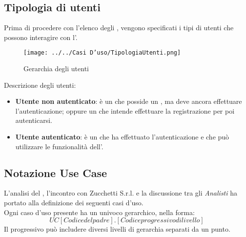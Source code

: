 \subsection{Tipologia di utenti}
Prima di procedere con l’elenco degli , vengono specificati i tipi di utenti che possono interagire con l'.
\begin{figure}[h!]
\centering
\texttt{[image: ../../Casi D'uso/TipologiaUtenti.png]}
\caption{Gerarchia degli utenti}
 \end{figure}

 Descrizione degli utenti:

 \begin{itemize}
 \item \textbf{Utente non autenticato}: è un  che posside un , ma deve ancora effettuare l'autenticazione; oppure un  che intende effettuare la registrazione per poi autenticarsi.
 \item \textbf{Utente autenticato}: è un  che ha effettuato l'autenticazione e che può utilizzare le funzionalità dell'.
 \end{itemize}

\subsection{Notazione Use Case}
L'analisi del , l'incontro con Zucchetti S.r.l. e la discussione tra gli \emph{Analisti} ha portato alla definizione dei seguenti casi d'uso.\\
Ogni caso d’uso presente ha un  univoco gerarchico, nella forma:
\[UC[Codice del padre].[Codice progressivo di livello]\]
Il  progressivo può includere diversi livelli di gerarchia separati da un punto.

\newpage
